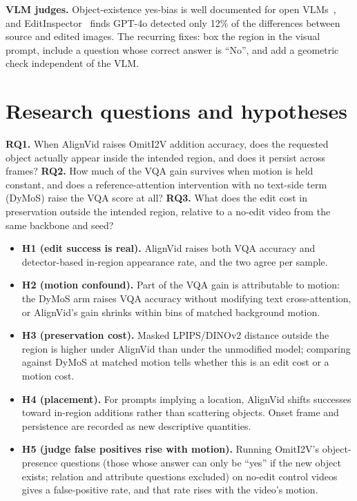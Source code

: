 \documentclass[10pt,a4paper]{article}
\begin{document}
\textbf{VLM judges.} Object-existence yes-bias is well documented for open VLMs~\cite{pope}, and EditInspector~\cite{editinspector} finds GPT-4o detected only 12\% of the differences between source and edited images. The recurring fixes: box the region in the visual prompt, include a question whose correct answer is ``No'', and add a geometric check independent of the VLM.

\section{Research questions and hypotheses}

\textbf{RQ1.} When AlignVid raises OmitI2V addition accuracy, does the requested object actually appear inside the intended region, and does it persist across frames?
\textbf{RQ2.} How much of the VQA gain survives when motion is held constant, and does a reference-attention intervention with no text-side term (DyMoS) raise the VQA score at all?
\textbf{RQ3.} What does the edit cost in preservation outside the intended region, relative to a no-edit video from the same backbone and seed?

\begin{itemize}
\item \textbf{H1 (edit success is real).} AlignVid raises both VQA accuracy and detector-based in-region appearance rate, and the two agree per sample.
\item \textbf{H2 (motion confound).} Part of the VQA gain is attributable to motion: the DyMoS arm raises VQA accuracy without modifying text cross-attention, or AlignVid's gain shrinks within bins of matched background motion.
\item \textbf{H3 (preservation cost).} Masked LPIPS/DINOv2 distance outside the region is higher under AlignVid than under the unmodified model; comparing against DyMoS at matched motion tells whether this is an edit cost or a motion cost.
\item \textbf{H4 (placement).} For prompts implying a location, AlignVid shifts successes toward in-region additions rather than scattering objects. Onset frame and persistence are recorded as new descriptive quantities.
\item \textbf{H5 (judge false positives rise with motion).} Running OmitI2V's object-presence questions (those whose answer can only be ``yes'' if the new object exists; relation and attribute questions excluded) on no-edit control videos gives a false-positive rate, and that rate rises with the video's motion.
\end{itemize}
\end{document}
